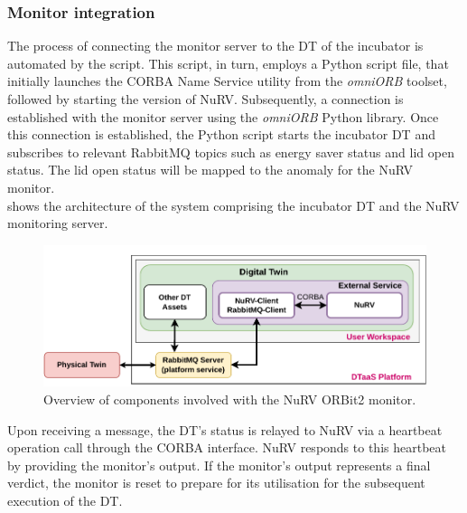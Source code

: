 \subsubsection{Monitor integration}
The process of connecting the monitor server to the DT of the incubator is automated by the  script. This script, in turn, employs a Python script file, that initially launches the  CORBA Name Service utility from the \textit{omniORB} toolset, followed by starting the  version of NuRV. Subsequently, a connection is established with the monitor server using the \textit{omniORB} Python library. Once this connection is established, the Python script starts the incubator DT and subscribes to relevant RabbitMQ topics such as energy saver status and lid open status. The lid open status will be mapped to the anomaly for the NuRV monitor.\\
 shows the architecture of the system comprising the incubator DT and the NuRV monitoring server.%
%
\begin{figure}[ht]
	\centering
	\includegraphics[width=\columnwidth]{images/NuRV-native-integration.pdf}
	\caption{Overview of components involved with the NuRV ORBit2 monitor.}
	\label{fig:nurv-orbit-architecture-diagram}
\end{figure}
%
Upon receiving a message, the DT's status is relayed to NuRV via a heartbeat operation call through the CORBA interface. NuRV responds to this heartbeat by providing the monitor's output. If the monitor's output represents a final verdict, the monitor is reset to prepare for its utilisation for the subsequent execution of the DT.
